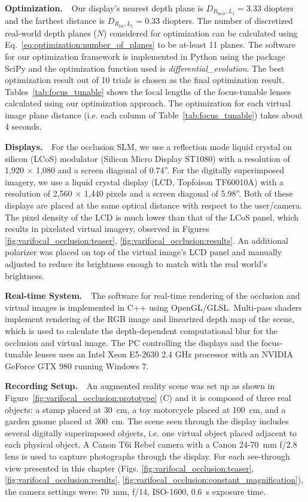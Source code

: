 {\bf Optimization. $\,\,$} 
Our display's nearest depth plane is $D_{R_{\text{near}},L_1} = 3.33$ diopters and the farthest distance is $D_{R_{\text{far}},L_1}=0.33$ diopters. The number of discretized real-world depth planes ($N$) considered for optimization can be calculated using Eq.~\eqref{eq:optimization:number_of_planes} to be at-least 11 planes. 
The software for our optimization framework is implemented in Python using the package SciPy and the optimization function used is \emph{differential\_evolution}. The best optimization result out of 10 trials is chosen as the final optimization result. Tables~\ref{tab:focus_tunable} shows the focal lengths of the focus-tunable lenses calculated using our optimization approach. The optimization for each virtual image plane distance (i.e. each column of Table~\ref{tab:focus_tunable}) takes about 4 seconds.

{\bf Displays. $\,\,$}  For the occlusion SLM, we use a reflection mode liquid crystal on silicon (LCoS) modulator (Silicon Micro Display ST1080) with a resolution of 1,920 $\times$ 1,080 and a screen diagonal of 0.74''. For the digitally superimposed imagery, we use a liquid crystal display (LCD, Topfoison TF60010A) with a resolution of 2,560 $\times$ 1,440 pixels and a screen diagonal of 5.98''. Both of these displays are placed at the same optical distance with respect to the user/camera. The pixel density of the LCD is much lower than that of the LCoS panel, which results in pixelated virtual imagery, observed in Figures \ref{fig:varifocal_occlusion:teaser}, \ref{fig:varifocal_occlusion:results}. An additional polarizer was placed on top of the virtual image's LCD panel and manually adjusted to reduce its brightness enough to match with the real world's brightness.


{\bf Real-time System. $\,\,$} The software for real-time rendering of the occlusion and virtual images is implemented in C++ using OpenGL/GLSL. Multi-pass shaders implement rendering of the RGB image and linearized depth map of the scene, which is used to calculate the depth-dependent computational blur for the occlusion and virtual image. The PC controlling the displays and the focus-tunable lenses uses an Intel Xeon E5-2630 2.4 GHz processor with an NVIDIA GeForce GTX 980 running Windows 7. 


{\bf Recording Setup. $\,\,$} An augmented reality scene was set up as shown in Figure~\ref{fig:varifocal_occlusion:prototype} (C) and it is composed of three real objects: a stamp placed at 30~cm, a toy motorcycle placed at 100~cm, and a garden gnome placed at 300~cm. The scene seen through the display includes several digitally superimposed objects, i.e. one virtual object placed adjacent to each physical object. A Canon T6i Rebel camera with a Canon 24-70~mm f/2.8 lens is used to capture photographs through the display. For each see-through view presented in this chapter (Figs. \ref{fig:varifocal_occlusion:teaser}, \ref{fig:varifocal_occlusion:results}, \ref{fig:varifocal_occlusion:constant_magnification}), the camera settings were: 70~mm, f/14, ISO-1600, 0.6~s exposure time. 


